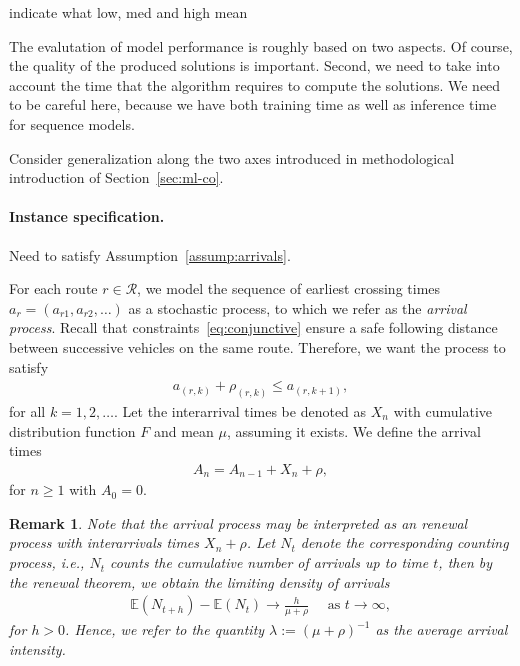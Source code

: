 \documentclass[a4paper]{report}
\theoremstyle{definition}
\theoremstyle{plain}
\newtheorem{remark}{Remark}[chapter]
\newcommand\note[1]{{\color{Navy}#1}}
\begin{document}
\note{indicate what low, med and high mean}

The evalutation of model performance is roughly based on two aspects. Of course,
the quality of the produced solutions is important. Second, we need to take into
account the time that the algorithm requires to compute the solutions. We need
to be careful here, because we have both training time as well as inference
time for sequence models.

Consider generalization along the two axes introduced in methodological
introduction of Section~\ref{sec:ml-co}.
%

\paragraph{Instance specification.}

\note{Need to satisfy Assumption~\ref{assump:arrivals}.}

For each route $r \in \mathcal{R}$, we model the sequence of earliest crossing times
$a_{r} = (a_{r1}, a_{r2}, \dots)$ as a stochastic process, to which we refer as
the \textit{arrival process}. Recall that constraints~\eqref{eq:conjunctive}
ensure a safe following distance between successive vehicles on the same route.
Therefore, we want the process to satisfy
\begin{align*}
  a_{(r, k)} + \rho_{(r,k)} \leq a_{(r, k + 1)} ,
\end{align*}
for all $k = 1, 2, \dots$.
%
Let the interarrival times be denoted as $X_{n}$ with cumulative distribution
function $F$ and mean $\mu$, assuming it exists. We define the arrival times
\begin{align*}
 A_{n} = A_{n-1} + X_{n} + \rho,
\end{align*}
 for $n \geq 1$ with $A_{0} = 0$.

\begin{remark}
Note that the arrival process may be interpreted as an renewal process with interarrivals
times $X_{n} + \rho$.
%
%
Let $N_{t}$ denote the corresponding counting process, i.e., $N_{t}$ counts the
cumulative number of arrivals up to time $t$, then by the \textit{renewal theorem}, we
obtain the \textit{limiting density} of arrivals
%
\begin{align*}
  \mathbb{E}(N_{t + h}) - \mathbb{E}(N_{t}) \rightarrow \frac{h}{\mu + \rho} \quad \text{ as } t \rightarrow \infty ,
\end{align*}
for $h > 0$. Hence, we refer to the quantity $\lambda := {(\mu + \rho)}^{-1}$ as the
average arrival intensity.
\end{remark}
\end{document}
